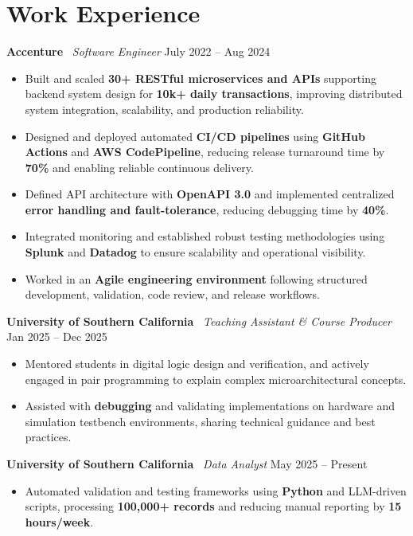 \documentclass[letterpaper,11pt]{article}
\begin{document}
\section*{Work Experience}

\textbf{Accenture} \textbar\ \textit{Software Engineer} \hfill July 2022 -- Aug 2024
\begin{itemize} \itemsep -2pt
    \item Built and scaled \textbf{30+ RESTful microservices and APIs} supporting backend system design for \textbf{10k+ daily transactions}, improving distributed system integration, scalability, and production reliability.
    \item Designed and deployed automated \textbf{CI/CD pipelines} using \textbf{GitHub Actions} and \textbf{AWS CodePipeline}, reducing release turnaround time by \textbf{70\%} and enabling reliable continuous delivery.
    \item Defined API architecture with \textbf{OpenAPI 3.0} and implemented centralized \textbf{error handling and fault-tolerance}, reducing debugging time by \textbf{40\%}.
    \item Integrated monitoring and established robust testing methodologies using \textbf{Splunk} and \textbf{Datadog} to ensure scalability and operational visibility.
    \item Worked in an \textbf{Agile engineering environment} following structured development, validation, code review, and release workflows.
\end{itemize}

\textbf{University of Southern California} \textbar\ \textit{Teaching Assistant \& Course Producer} \hfill Jan 2025 -- Dec 2025
\begin{itemize} \itemsep -2pt
    \item Mentored students in digital logic design and verification, and actively engaged in pair programming to explain complex microarchitectural concepts.
    \item Assisted with \textbf{debugging} and validating implementations on hardware and simulation testbench environments, sharing technical guidance and best practices.
\end{itemize}

\textbf{University of Southern California} \textbar\ \textit{Data Analyst} \hfill May 2025 -- Present
\begin{itemize} \itemsep -2pt
    \item Automated validation and testing frameworks using \textbf{Python} and LLM-driven scripts, processing \textbf{100,000+ records} and reducing manual reporting by \textbf{15 hours/week}.
\end{itemize}
\end{document}
